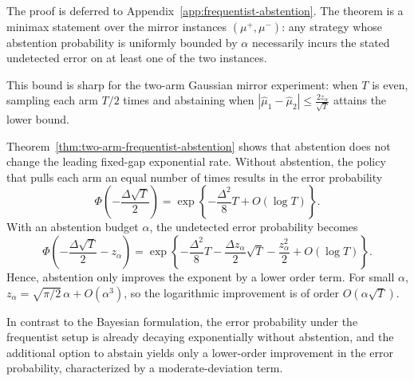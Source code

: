 \documentclass[10pt]{article}
\theoremstyle{plain}
\begin{document}
The proof is deferred to Appendix~\ref{app:frequentist-abstention}. The theorem is a   minimax statement over the mirror instances \((\mu^+,\mu^-)\): any
strategy whose abstention probability is uniformly bounded by \(\alpha\) 
necessarily incurs the stated undetected error on at least one of the two instances. 

This bound is sharp for the two-arm Gaussian mirror experiment: when \(T\) is even, sampling
each arm \(T/2\) times and abstaining when $|\hat\mu_1-\hat\mu_2|\le \frac{2z_\alpha}{\sqrt T}$
attains the lower bound.

Theorem~\ref{thm:two-arm-frequentist-abstention} shows that abstention does not
change the leading fixed-gap exponential rate. Without abstention, the policy that pulls each arm an equal number of times results in the error probability %
\[
    \Phi\!\left(-\frac{\Delta\sqrt T}{2}\right)
    =
    \exp\!\left\{
        -\frac{\Delta^2}{8}T+O(\log T)
    \right\}.
\]
With an abstention budget \(\alpha\), the undetected error probability becomes
\[
    \Phi\!\left(
        -\frac{\Delta\sqrt T}{2}-z_\alpha
    \right)
    =
    \exp\!\left\{
        -\frac{\Delta^2}{8}T
        -\frac{\Delta z_\alpha}{2}\sqrt T
        -\frac{z_\alpha^2}{2}
        +O(\log T)
    \right\}.
\]
Hence, abstention only improves the exponent by a lower order term. For small \(\alpha\),
\(z_\alpha=\sqrt{\pi/2}\,\alpha+O(\alpha^3)\), so the logarithmic improvement is
of order \(O(\alpha\sqrt T)\). %

In contrast to the   Bayesian formulation,  the error probability under the frequentist setup is already decaying exponentially without abstention, and 
 the additional option to abstain yields only a lower-order improvement in the error probability, characterized by a moderate-deviation term.
 
\end{document}
